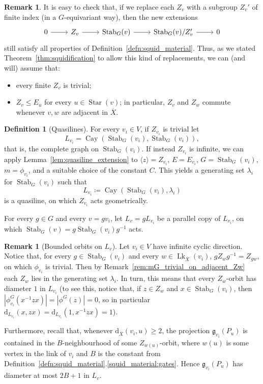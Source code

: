 \documentclass[svgnames]{amsart}
\theoremstyle{plain}
\theoremstyle{definition}
\newtheorem{defn}[thm]{Definition}
\newtheorem{rem}[thm]{Remark}
\newcommand{\Cay}[2]{\operatorname{Cay}\left(#1,#2\right)}
\newcommand{\ov}[1]{\overline{#1}}
\newcommand{\dist}{\mathrm{d}}
\newcommand{\link}{\operatorname{Lk}}
\newcommand{\Stab}[2]{\operatorname{Stab}_{#1}(#2)}
\newcommand{\gate}{\mathfrak{g}}
\begin{document}
\begin{rem}
It is easy to check that, if we replace each $Z_v$ with a subgroup $Z_v'$ of finite index (in a $G$-equivariant way), then the new extensions
$$\begin{tikzcd}
0\ar{r}&Z_v\ar{r}&\Stab{G}{v}\ar{r}&\Stab{G}{v}/Z_v'\ar{r}&0
\end{tikzcd}$$
still satisfy all properties of Definition~\ref{defn:squid_material}. Thus, as we stated Theorem~\ref{thm:squidification} to allow this kind of replacements, we can (and will) assume that: 
\begin{itemize}
\item every finite $Z_v$ is trivial;
\item $Z_v\le E_u$ for every $u\in\operatorname{Star}(v)$; in particular, $Z_v$ and $Z_w$ commute whenever $v,w$ are adjacent in $\ov X$.
\end{itemize}
\end{rem}


\begin{defn}[Quasilines]\label{defn:quasilines_from_quasimorph_for_squid} 
For every $v_i\in V$, if $Z_{v_i}$ is trivial let $$L_{v_i}=\Cay{\Stab{G}{v_i}}{\Stab{G}{v_i}},$$ that is, the complete graph on $\Stab{G}{v_i}$. If instead $Z_{v_i}$ is infinite, we can apply Lemma~\ref{lem:quasiline_extension} to $\langle z\rangle=Z_{v_i}$, $E=E_{v_i}$, $G=\Stab{G}{v_i}$, $m=\phi_{v_i}$, and a suitable choice of the constant $C$.  This yields a generating set $\lambda_i$ for $\Stab{G}{v_i}$ such that $$L_{v_i}\coloneq \Cay{\Stab{G}{v_i}}{\lambda_i}$$ is a quasiline, on which $Z_{v_i}$ acts geometrically.

For every $g\in G$ and every $v=gv_i$, let $L_v=gL_{v_i}$ be a parallel copy of $L_{v_i}$, on which $\Stab{G}{v}=g\Stab{G}{v_i}g^{-1}$ acts. 
\end{defn}

\begin{rem}[Bounded orbits on $L_v$]\label{rem:bounded_orbits_Lv}
    Let $v_i\in V$ have infinite cyclic direction. Notice that, for every $g\in \Stab{G}{v_i}$ and every $w\in\link_{\ov X}(v_i)$, $gZ_wg^{-1}=Z_{gw}$, on which $\phi_{v_i}$ is trivial. Then by Remark~\ref{rem:mG_trivial_on_adjacent_Zw} each $Z_w$ lies in the generating set $\lambda_i$. In turn, this means that every $Z_w$-orbit has diameter $1$ in $L_{v_i}$ (to see this, notice that, if $z\in Z_w$ and $x\in \Stab{G}{v_i}$, then $|\phi^G_{v_i}(x^{-1}zx)|=|\phi^G(z)|=0$, so in particular $\dist_{L_{v_i}}(x,zx)=\dist_{L_{v_i}}(1,x^{-1}zx)=1$). 

Furthermore, recall that, whenever $\dist_{\ov{X}}(v_i,u)\ge 2$, the projection $\gate_{v_i}(P_u)$ is contained in the $B$-neighbourhood of some $Z_{w(u)}$-orbit, where $w(u)$ is some vertex in the link of $v_i$ and $B$ is the constant from Definition~\ref{defn:squid_material}.\eqref{squid_material:gates}. Hence $\gate_{v_i}(P_u)$ has diameter at most $2B+1$ in $L_v$.
\end{rem}
\end{document}
